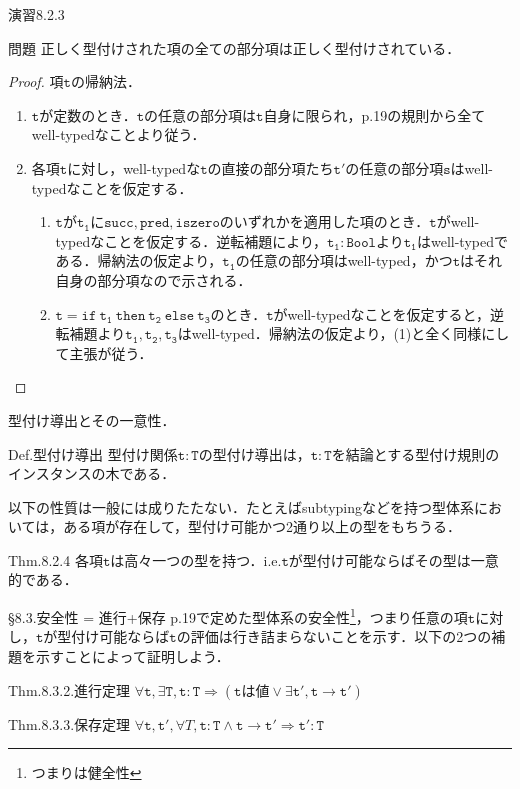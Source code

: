 \documentclass[9pt]{beamer}
\begin{document}
\begin{frame}{演習8.2.3}
\begin{alertblock}{問題}
正しく型付けされた項の全ての部分項は正しく型付けされている．
\end{alertblock}
\begin{proof}
	項$\mathtt{t}$の帰納法．
\begin{enumerate}
	\item $\mathtt{t}$が定数のとき．$\mathtt{t}$の任意の部分項は$\mathtt{t}$自身に限られ，p.19の規則から全てwell-typedなことより従う．
	\item 各項$\mathtt{t}$に対し，well-typedな$\mathtt{t}$の直接の部分項たち$\mathtt{t'}$の任意の部分項$\mathtt{s}$はwell-typedなことを仮定する．\begin{enumerate}
		\item $\mathtt{t}$が$\mathtt{t_{1}}$に$\mathtt{succ, pred, iszero}$のいずれかを適用した項のとき．$\mathtt{t}$がwell-typedなことを仮定する．逆転補題により，$\mathtt{t_{1}:Bool}$より$\mathtt{t_{1}}$はwell-typedである．帰納法の仮定より，$\mathtt{t_{1}}$の任意の部分項はwell-typed，かつ$\mathtt{t}$はそれ自身の部分項なので示される．
		\item $\mathtt{t} =\mathtt{if\ t_{1}\ then\ t_{2}\ else\ t_{3}}$のとき．$\mathtt{t}$がwell-typedなことを仮定すると，逆転補題より$\mathtt{t_{1},t_{2}, t_{3}}$はwell-typed．帰納法の仮定より，(1)と全く同様にして主張が従う．
	\end{enumerate}
\end{enumerate}
\end{proof}
\end{frame}
\begin{frame}{型付け導出とその一意性．}
\begin{alertblock}{Def.型付け導出}
	型付け関係$\mathtt{t:T}$の型付け導出は，$\mathtt{t:T}$を結論とする型付け規則のインスタンスの木である．
\end{alertblock}
以下の性質は一般には成りたたない．たとえばsubtypingなどを持つ型体系においては，ある項が存在して，型付け可能かつ2通り以上の型をもちうる．
\begin{dblock}{Thm.8.2.4}
各項$\mathtt{t}$は高々一つの型を持つ．i.e.$\mathtt{t}$が型付け可能ならばその型は一意的である．
\end{dblock}
\end{frame}
\begin{frame}{\S 8.3.安全性 = 進行+保存}
p.19で定めた型体系の安全性\footnote{つまりは健全性}，つまり任意の項$\mathtt{t}$に対し，$\mathtt{t}$が型付け可能ならば$\mathtt{t}$の評価は行き詰まらないことを示す．以下の2つの補題を示すことによって証明しよう．\begin{dblock}{Thm.8.3.2.進行定理}
$\forall \mathtt{t},\exists\mathtt{T}, \mathtt{t:T}\Rightarrow (\mathtt{t}\text{は値}\lor\exists \mathtt{t'}, \mathtt{t\rightarrow t'})$
\end{dblock}
\begin{dblock}{Thm.8.3.3.保存定理}
	$\forall \mathtt{t,t'},\forall{T}, \mathtt{t:T\land t\rightarrow t'}\Rightarrow \mathtt{t':T}$
\end{dblock}
\end{frame}
\end{document}
